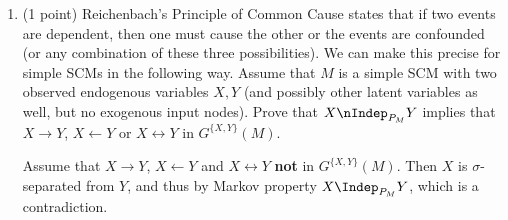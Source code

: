 \begin{enumerate}
\begin{gradedsolution}
\begin{enumerate}
		
		\item That $M$ and $\tilde{M}$ are interventionally equivalent with respect to $O$ means that, for all $T \subseteq O$, $M_{\text{do}(T)}$ is observationally equivalent to $\tilde{M}_{\text{do}(T)}$ with respect to $O \setminus T$.
		Setting $T = \emptyset$ implies that $M$ and $\tilde{M}$ are observationally equivalent with respect to $O$.
	\end{enumerate}
\end{gradedsolution}

\item (1 point) Reichenbach's Principle of Common Cause states that if two events are dependent,
then one must cause the other or the events are confounded (or any combination of these three possibilities).
We can make this precise for simple SCMs in the following way. Assume that $M$
is a simple SCM with two observed endogenous variables $X,Y$ (and possibly other
latent variables as well, but no exogenous input nodes). Prove that 
$X \nIndep_{P_{M}} Y$
implies that $X \to Y$,
$X \leftarrow Y$ or $X \leftrightarrow Y$ in $G^{\{X,Y\}}(M)$.

\begin{gradedsolution}
	Assume that $X \to Y$, $X \leftarrow Y$ and $X \leftrightarrow Y$ \textbf{not} in $G^{\{X,Y\}}(M)$. Then $X$ is $\sigma$-separated from $Y$, and thus by Markov property $X \Indep_{P_{M}} Y$, which is a contradiction.
\end{gradedsolution}
\end{enumerate}

